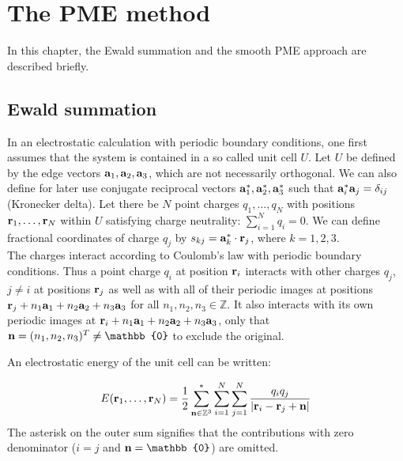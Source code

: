 \documentclass[12pt,a4paper]{report}
\newcommand{\draft}[1]{#1}
\begin{document}
\newpage

\chapter{The PME method}
In this chapter, the Ewald summation and the smooth PME approach are described briefly.

\section{Ewald summation} \label{sec_ewald}
In an electrostatic calculation with periodic boundary conditions, one first assumes that the system is contained in a so called unit cell $U$. Let $U$ be defined by the edge vectors $\bold{a}_1, \bold{a}_2, \bold{a}_3$, which are not necessarily orthogonal. We can also define for later use conjugate reciprocal vectors $\bold{a}_1^*, \bold{a}_2^*, \bold{a}_3^*$ such that $\bold{a}_i^* \bold{a}_j = \delta_{ij}$ (Kronecker delta).
 Let there be $N$ point charges $q_1, \dotsc, q_N$ with positions $\bold{r}_1, \dotsc, \bold{r}_N$ within $U$ satisfying charge neutrality:  $\sum\limits_{i=1}^N q_i=0$. We can define fractional coordinates of charge $q_j$ by $s_{kj} = \bold{a}_k^* \cdot \bold{r}_j$, where $k = 1, 2, 3$. 
\\
The charges interact according to Coulomb’s law with periodic boundary conditions. Thus a point charge $q_i$ at position $\bold{r}_i$ interacts with
other charges $q_j$, $j \neq i$ at positions $\bold{r}_j$ as well as with all of
their periodic images at positions $\bold{r}_j + n_1 \bold{a}_1  + n_2 \bold{a}_2  + n_3 \bold{a}_3$ for
all $n_1, n_2 , n_3 \in \mathbb{Z}$. It also interacts with its own periodic
images at $\bold{r}_i + n_1 \bold{a}_1  + n_2 \bold{a}_2  + n_3 \bold{a}_3$, only that  $\bold{n} = (n_1, n_2, n_3)^T \neq \mathbb{0}$ to exclude the original. 

An electrostatic energy of the unit cell can be written:

\begin{equation} \label{eq:ewald}
E(\bold{r}_1, \dotsc, \bold{r}_N) = \frac{1}{2} \sum\limits_{\bold{n} \in \mathbb{Z}^3}^* \sum_{i=1}^N \sum\limits_{j=1}^N \frac{q_i q_j}{\lvert\bold{r}_i - \bold{r}_j + \bold{n} \rvert}
\end{equation}
The asterisk on the outer sum signifies that the contributions with zero denominator ($i =j$ and $\bold{n} = \mathbb{0}$) are omitted.
\end{document}
